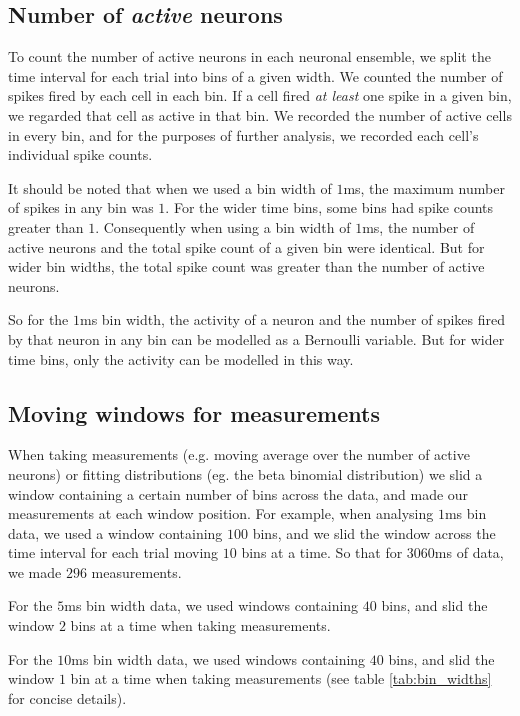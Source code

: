     \subsection{Number of \textit{active} neurons}\label{sec:num_active_neurons}
    To count the number of active neurons in each neuronal ensemble, we split the time interval for each trial into bins of a given width. We counted the number of spikes fired by each cell in each bin. If a cell fired \textit{at least} one spike in a given bin, we regarded that cell as active in that bin. We recorded the number of active cells in every bin, and for the purposes of further analysis, we recorded each cell's individual spike counts.

    It should be noted that when we used a bin width of $1$ms, the maximum number of spikes in any bin was $1$. For the wider time bins, some bins had spike counts greater than $1$. Consequently when using a bin width of $1$ms, the number of active neurons and the total spike count of a given bin were identical. But for wider bin widths, the total spike count was greater than the number of active neurons.

    So for the $1$ms bin width, the activity of a neuron and the number of spikes fired by that neuron in any bin can be modelled as a Bernoulli variable. But for wider time bins, only the activity can be modelled in this way.

    \subsection{Moving windows for measurements}

    When taking measurements (e.g. moving average over the number of active neurons) or fitting distributions (eg. the beta binomial distribution) we slid a window containing a certain number of bins across the data, and made our measurements at each window position. For example, when analysing $1$ms bin data, we used a window containing $100$ bins, and we slid the window across the time interval for each trial moving $10$ bins at a time. So that for $3060$ms of data, we made $296$ measurements.

    For the $5$ms bin width data, we used windows containing $40$ bins, and slid the window $2$ bins at a time when taking measurements.

    For the $10$ms bin width data, we used windows containing $40$ bins, and slid the window $1$ bin at a time when taking measurements (see table \ref{tab:bin_widths} for concise details).

